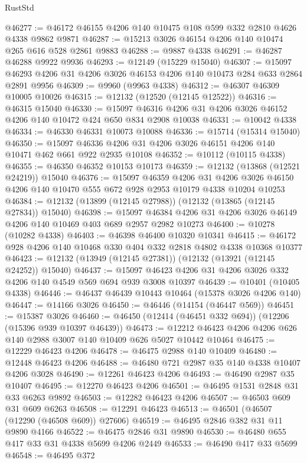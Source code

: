 \begin{lexlean}{RustStd}
\begin{coremodule}
{\begin{coremodule}
{{{{{{{{{{{{{{{{{{{{{{{{{{{{{{{{{{{{{{{{{{{{{{{{{{@46277 := @46172 @46155 @4206 @140 @10475 @108 @599 @332 @2810 @4626 @4338 @9862 @9871
@46287 := @15213 @3026 @46154 @4206 @140 @10474 @265 @616 @528 @2861 @9883
@46288 := @9887 @4338
@46291 := @46287 @46288 @9922 @9936
@46293 := @12149 (@15229 @15040)
@46307 := @15097 @46293 @4206 @31 @4206 @3026 @46153 @4206 @140 @10473 @284 @633 @2864 @2891 @9956
@46309 := @9960 (@9963 @4338)
@46312 := @46307 @46309 @10005 @10026
@46315 := @12132 (@12520 (@12145 @12522))
@46316 := @46315 @15040
@46330 := @15097 @46316 @4206 @31 @4206 @3026 @46152 @4206 @140 @10472 @424 @650 @834 @2908 @10038
@46331 := @10042 @4338
@46334 := @46330 @46331 @10073 @10088
@46336 := @15714 (@15314 @15040)
@46350 := @15097 @46336 @4206 @31 @4206 @3026 @46151 @4206 @140 @10471 @462 @661 @922 @2935 @10108
@46352 := @10112 (@10115 @4338)
@46355 := @46350 @46352 @10153 @10173
@46359 := @12132 (@13868 (@12521 @24219)) @15040
@46376 := @15097
    @46359
    @4206
    @31
    @4206
    @3026
    @46150
    @4206
    @140
    @10470
    @555
    @672
    @928
    @2953
    @10179
    @4338
    @10204
    @10253
@46384 := @12132 (@13899 (@12145 @27988)) (@12132 (@13865 (@12145 @27834)) @15040)
@46398 := @15097 @46384 @4206 @31 @4206 @3026 @46149 @4206 @140 @10469 @403 @689 @2957 @2982 @10273
@46400 := @10278 (@10282 @4338)
@46403 := @46398 @46400 @10320 @10341
@46415 := @46172 @928 @4206 @140 @10468 @330 @404 @332 @2818 @4802 @4338 @10368 @10377
@46423 := @12132 (@13949 (@12145 @27381)) (@12132 (@13921 (@12145 @24252)) @15040)
@46437 := @15097 @46423 @4206 @31 @4206 @3026 @332 @4206 @140 @4549 @569 @694 @939 @3008 @10397
@46439 := @10401 (@10405 @4338)
@46446 := @46437 @46439 @10443 @10464 (@15378 @3026 @4206 @140)
@46447 := @14166 @3026
@46450 := @46446 (@14154 (@46447 @569))
@46451 := @15387 @3026
@46460 := @46450 (@12414 (@46451 @332 @694)) (@12206 (@15396 @939 @10397 @46439))
@46473 := @12212 @46423 @4206 @4206 @626 @140 @2988 @3007 @140 @10409 @626 @5027 @10442 @10464
@46475 := @12229 @46423 @4206
@46478 := @46475 @2988 @140 @10409
@46480 := @12448 @46423 @4206
@46488 := @46480 @721 @2987 @35 @140 @4338 @10407 @4206 @3028
@46490 := @12261 @46423 @4206
@46493 := @46490 @2987 @35 @10407
@46495 := @12270 @46423 @4206
@46501 := @46495 @1531 @2848 @31 @33 @6263 @9892
@46503 := @12282 @46423 @4206
@46507 := @46503 @609 @31 @609 @6263
@46508 := @12291 @46423
@46513 := @46501 (@46507 (@12290 (@46508 @609)) @27606)
@46519 := @46495 @2846 @382 @31 @11 @9890 @4166
@46522 := @46475 @2846 @31 @9890
@46530 := @46480 @655 @417 @33 @31 @4338 @5699 @4206 @2449
@46533 := @46490 @417 @33 @5699
@46548 := @46495
    @372
}}}}}}}}}}}}}}}}}}}}}}}}}}}}}}}}}}}}}}}}}}}}}}}}}}
\end{coremodule}}
\end{coremodule}
\end{lexlean}
